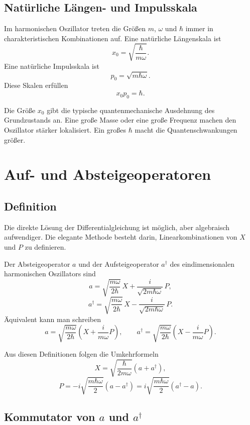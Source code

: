 \subsection{Natürliche Längen- und Impulsskala}

Im harmonischen Oszillator treten die Größen $m$, $\omega$ und $\hbar$ immer in charakteristischen Kombinationen auf. Eine natürliche Längenskala ist
\[
    x_0=\sqrt{\frac{\hbar}{m\omega}}.
\]
Eine natürliche Impulsskala ist
\[
    p_0=\sqrt{m\hbar\omega}.
\]
Diese Skalen erfüllen
\[
    x_0p_0=\hbar.
\]

\begin{notebox}
Die Größe $x_0$ gibt die typische quantenmechanische Ausdehnung des Grundzustands an. Eine große Masse oder eine große Frequenz machen den Oszillator stärker lokalisiert. Ein großes $\hbar$ macht die Quantenschwankungen größer.
\end{notebox}

\section{Auf- und Absteigeoperatoren}

\subsection{Definition}

Die direkte Lösung der Differentialgleichung ist möglich, aber algebraisch aufwendiger. Die elegante Methode besteht darin, Linearkombinationen von $X$ und $P$ zu definieren.

\begin{definitionbox}
Der Absteigeoperator $a$ und der Aufsteigeoperator $a^\dagger$ des eindimensionalen harmonischen Oszillators sind
\[
    a=\sqrt{\frac{m\omega}{2\hbar}}\,X+\frac{i}{\sqrt{2m\hbar\omega}}\,P,
\]
\[
    a^\dagger=\sqrt{\frac{m\omega}{2\hbar}}\,X-\frac{i}{\sqrt{2m\hbar\omega}}\,P.
\]
Äquivalent kann man schreiben
\[
    a=\sqrt{\frac{m\omega}{2\hbar}}\left(X+\frac{i}{m\omega}P\right),
    \qquad
    a^\dagger=\sqrt{\frac{m\omega}{2\hbar}}\left(X-\frac{i}{m\omega}P\right).
\]
\end{definitionbox}

Aus diesen Definitionen folgen die Umkehrformeln
\[
    X=\sqrt{\frac{\hbar}{2m\omega}}(a+a^\dagger),
\]
\[
    P=-i\sqrt{\frac{m\hbar\omega}{2}}(a-a^\dagger)
    =i\sqrt{\frac{m\hbar\omega}{2}}(a^\dagger-a).
\]

\subsection{Kommutator von $a$ und $a^\dagger$}

